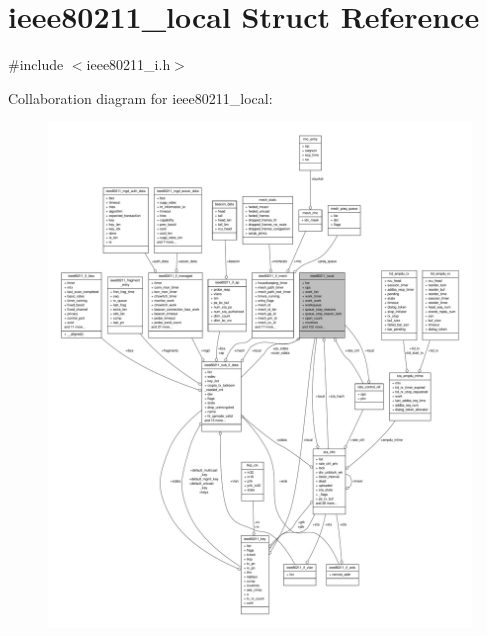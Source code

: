 \hypertarget{structieee80211__local}{\section{ieee80211\-\_\-local Struct Reference}
\label{structieee80211__local}
}


{\ttfamily \#include $<$ieee80211\-\_\-i.\-h$>$}



Collaboration diagram for ieee80211\-\_\-local\-:
\nopagebreak
\begin{figure}[H]
\begin{center}
\leavevmode
\includegraphics[width=350pt]{structieee80211__local__coll__graph}
\end{center}
\end{figure}
